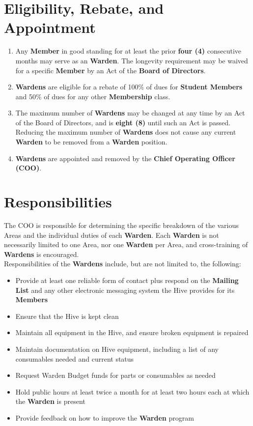 \documentclass[11pt, oneside]{article}   	%
\begin{document}
\section{Eligibility, Rebate, and Appointment}
\begin{enumerate}
\item Any \textbf{Member} in good standing for at least the prior \textbf{four (4)} consecutive months may serve as an \textbf{Warden}.
The longevity requirement may be waived for a specific \textbf{Member} by an Act of the \textbf{Board of Directors}.
\item \textbf{Wardens} are eligible for a rebate of 100\% of dues for \textbf{Student Members} and 50\% of dues for any other \textbf{Membership} class.
\item The maximum number of \textbf{Wardens} may be changed at any time by an Act of the Board of Directors, and is \textbf{eight (8)} until such an Act is passed.
Reducing the maximum number of \textbf{Wardens} does not cause any current \textbf{Warden} to be removed from a \textbf{Warden} position.
\item \textbf{Wardens} are appointed and removed by the \textbf{Chief Operating Officer (COO)}.
\end{enumerate}

\section{Responsibilities}
The COO is responsible for determining the specific breakdown of the various Areas and the individual duties of each \textbf{Warden}.
Each \textbf{Warden} is not necessarily limited to one Area, nor one \textbf{Warden} per Area, and cross-training of \textbf{Wardens} is encouraged.\\
Responsibilities of the \textbf{Wardens} include, but are not limited to, the following:
\begin{itemize}[noitemsep]
\item Provide at least one reliable form of contact plus respond on the \textbf{Mailing List} and any other electronic messaging system the Hive provides for its \textbf{Members}
\item Ensure that the Hive is kept clean
\item Maintain all equipment in the Hive, and ensure broken equipment is repaired
\item Maintain documentation on Hive equipment, including a list of any consumables needed and current status
\item Request Warden Budget funds for parts or consumables as needed
\item Hold public hours at least twice a month for at least two hours each at which the \textbf{Warden} is present
\item Provide feedback on how to improve the \textbf{Warden} program
\end{itemize}
\end{document}
